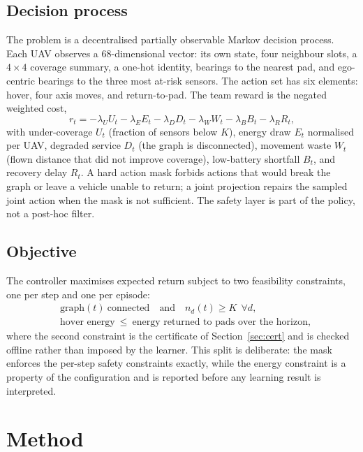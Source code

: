 \documentclass[conference]{IEEEtran}
\begin{document}
\subsection{Decision process}
The problem is a decentralised partially observable Markov decision process. Each UAV observes a 68-dimensional vector: its own state, four neighbour slots, a $4\times4$ coverage summary, a one-hot identity, bearings to the nearest pad, and ego-centric bearings to the three most at-risk sensors. The action set has six elements: hover, four axis moves, and return-to-pad. The team reward is the negated weighted cost,
\begin{equation}
r_t = -\lambda_U U_t - \lambda_E E_t - \lambda_D D_t - \lambda_W W_t - \lambda_B B_t - \lambda_R R_t,
\label{eq:reward}
\end{equation}
with under-coverage $U_t$ (fraction of sensors below $K$), energy draw $E_t$ normalised per UAV, degraded service $D_t$ (the graph is disconnected), movement waste $W_t$ (flown distance that did not improve coverage), low-battery shortfall $B_t$, and recovery delay $R_t$. A hard action mask forbids actions that would break the graph or leave a vehicle unable to return; a joint projection repairs the sampled joint action when the mask is not sufficient. The safety layer is part of the policy, not a post-hoc filter.

\subsection{Objective}
The controller maximises expected return subject to two feasibility constraints, one per step and one per episode:
\begin{align}
&\text{graph}(t)\ \text{connected}\quad\text{and}\quad n_d(t)\ge K\ \ \forall d,\label{eq:step}\\
&\text{hover energy}\ \le\ \text{energy returned to pads over the horizon},\label{eq:ep}
\end{align}
where the second constraint is the certificate of Section~\ref{sec:cert} and is checked offline rather than imposed by the learner. This split is deliberate: the mask enforces the per-step safety constraints exactly, while the energy constraint is a property of the configuration and is reported before any learning result is interpreted.

\section{Method}
\end{document}
